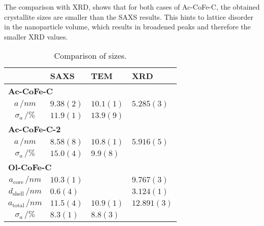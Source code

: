 \documentclass[\main/dresen_thesis.tex]{subfiles}
\begin{document}
    The comparison with XRD, shows that for both cases of Ac-CoFe-C, the obtained crystallite sizes are smaller than the SAXS results.
    This hints to lattice disorder in the nanoparticle volume, which results in broadened peaks and therefore the smaller XRD values.

    \begin{table}[ht]
      \centering
      \caption{\label{tab:monolayers:nanoparticle:saxs:sizeComparison}Comparison of sizes.}
      \begin{tabular}{ c | l | l | l }
                            & \textbf{SAXS} & \textbf{TEM} & \textbf{XRD}\\
        \hline
        \multicolumn{4}{l}{\textbf{Ac-CoFe-C}}\\
        \hline
        $a \, / \unit{nm}$  & $9.38(2)$       & $10.1(1)$ & $5.285(3)$\\
        $\sigma_a \, / \%$  & $11.9(1)$       & $13.9(9)$ & \\
        \hline
        \multicolumn{4}{l}{\textbf{Ac-CoFe-C-2}}\\
        \hline
        $a \, / \unit{nm}$  & $8.58(8)$       & $10.8(1)$ & $5.916(5)$\\
        $\sigma_a \, / \%$  & $15.0(4)$       & $9.9(8)$  & \\
        \hline
        \multicolumn{4}{l}{\textbf{Ol-CoFe-C}}\\
        \hline
        $a_\mathrm{core} \, / \unit{nm}$      & $10.3(1)$       &           & $9.767(3)$\\
        $d_\mathrm{shell} \, / \unit{nm}$     & $0.6(4)$        &           & $3.124(1)$\\
        $a_\mathrm{total} \, / \unit{nm}$     & $11.5(4)$       & $10.9(1)$ & $12.891(3)$\\
        $\sigma_a \, / \%$                    & $8.3(1)$        & $8.8(3)$  & \\
        \hline
      \end{tabular}
    \end{table}


\end{document}
